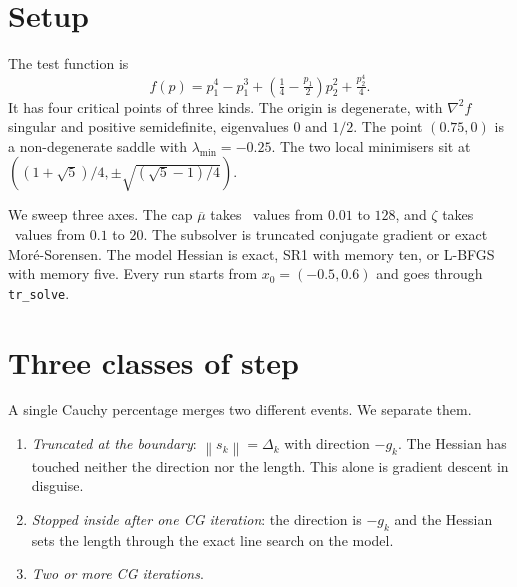 \documentclass[11pt,a4paper]{article}
\providecommand{\norm}[1]{\left \lVert #1 \right \rVert}
\begin{document}
\section{Setup}\label{sec: setup}

The test function is
\begin{equation}
  f(p) = p_1^4 - p_1^3 + \left(\tfrac14 - \tfrac{p_1}{2}\right)p_2^2
         + \tfrac{p_2^4}{4} .
  \label{eqn: f}
\end{equation}
It has four critical points of three kinds. The origin is degenerate, with
$\nabla^2 f$ singular and positive semidefinite, eigenvalues $0$ and $1/2$. The
point $(0.75, 0)$ is a non-degenerate saddle with $\lambda_{\min} = -0.25$. The
two local minimisers sit at $((1+\sqrt5)/4, \pm\sqrt{(\sqrt5-1)/4})$.

We sweep three axes. The cap $\overline{\mu}$ takes \NCaps\ values from $0.01$ to
$128$, and $\zeta$ takes \NZetas\ values from $0.1$ to $20$. The subsolver is
truncated conjugate gradient or exact Mor\'e-Sorensen. The model Hessian is
exact, SR1 with memory ten, or L-BFGS with memory five. Every run starts from
$x_0 = (-0.5, 0.6)$ and goes through \texttt{tr\_solve}.

\section{Three classes of step}\label{sec: classes}

A single Cauchy percentage merges two different events. We separate them.

\begin{enumerate}[leftmargin=2em]
  \item \emph{Truncated at the boundary}: $\norm{s_k} = \Delta_k$ with direction
        $-g_k$. The Hessian has touched neither the direction nor the length.
        This alone is gradient descent in disguise.
  \item \emph{Stopped inside after one CG iteration}: the direction is $-g_k$
        and the Hessian sets the length through the exact line search on the
        model.
  \item \emph{Two or more CG iterations}.
\end{enumerate}
\end{document}
